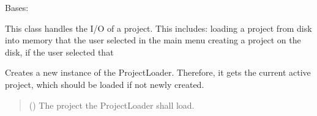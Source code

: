 \documentclass[letterpaper,10pt,english]{sphinxmanual}
\begin{document}
\begin{fulllineitems}
\label{\detokenize{apidoc/src.osm_configurator.model.project:src.osm_configurator.model.project.project_io_handler.ProjectIOHandler}}
\pysigstartsignatures
{}
\pysigstopsignatures
\sphinxAtStartPar
Bases: 

\sphinxAtStartPar
This class handles the I/O of a project.
This includes:
\sphinxhyphen{} loading a project from disk into memory that the user selected in the main menu
\sphinxhyphen{} creating a project on the disk, if the user selected that

\begin{fulllineitems}
\label{\detokenize{apidoc/src.osm_configurator.model.project:src.osm_configurator.model.project.project_io_handler.ProjectIOHandler.__init__}}
\pysigstartsignatures
{}
\pysigstopsignatures
\sphinxAtStartPar
Creates a new instance of the ProjectLoader. Therefore, it gets the current active project, which should be
loaded if not newly created.
\begin{quote}\begin{description}
\sphinxAtStartPar
{} ({\hyperref[\detokenize{apidoc/src.osm_configurator.model.project:src.osm_configurator.model.project.active_project.ActiveProject}]{}}) \textendash{} The project the ProjectLoader shall load.

\end{description}\end{quote}

\end{fulllineitems}



\end{fulllineitems}
\end{document}
